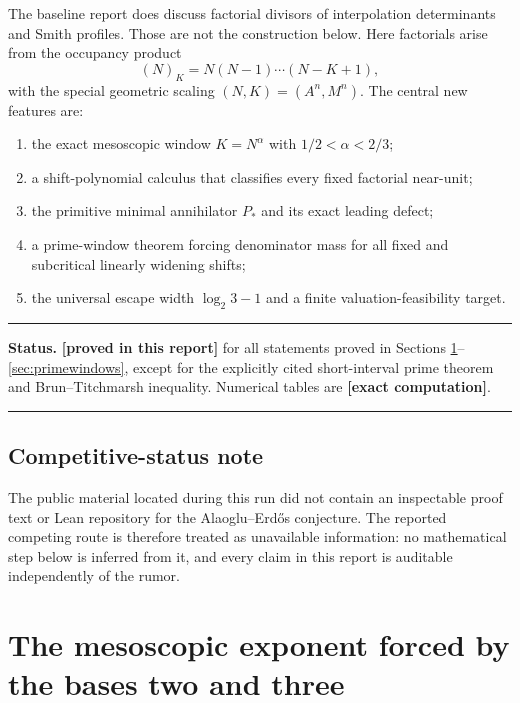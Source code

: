 \documentclass[11pt,oneside]{article}
\theoremstyle{definition}
\theoremstyle{remark}
\newcommand{\statusnew}{\textcolor{newgreen}{\textbf{[proved in this report]}}}
\newcommand{\statuscomp}{\textcolor{computeviolet}{\textbf{[exact computation]}}}
\newenvironment{statusbox}[1]
{\begin{center}\begin{minipage}{0.94\textwidth}\raggedright\hrule\vspace{0.45em}
\textbf{Status.} #1\par\vspace{0.35em}}
{\vspace{0.35em}\hrule\end{minipage}\end{center}}
\begin{document}
The baseline report does discuss factorial divisors of interpolation determinants and Smith
profiles.  Those are not the construction below.  Here factorials arise from the occupancy
product
\[
 (N)_K=N(N-1)\cdots(N-K+1),
\]
with the special geometric scaling $(N,K)=(A^n,M^n)$.  The central new features are:
\begin{enumerate}
\item the exact mesoscopic window $K=N^{\alpha}$ with $1/2<\alpha<2/3$;
\item a shift-polynomial calculus that classifies every fixed factorial near-unit;
\item the primitive minimal annihilator $P_*$ and its exact leading defect;
\item a prime-window theorem forcing denominator mass for all fixed and subcritical
      linearly widening shifts;
\item the universal escape width $\log_2 3-1$ and a finite valuation-feasibility target.
\end{enumerate}

\begin{statusbox}{\statusnew{} for all statements proved in Sections
\ref{sec:mesoscopic}--\ref{sec:primewindows}, except for the explicitly cited short-interval
prime theorem and Brun--Titchmarsh inequality.  Numerical tables are \statuscomp{}.}
\end{statusbox}

\subsection{Competitive-status note}

The public material located during this run did not contain an inspectable proof text or Lean
repository for the Alaoglu--Erd\H{o}s conjecture.  The reported competing route is therefore
treated as unavailable information: no mathematical step below is inferred from it, and every
claim in this report is auditable independently of the rumor.

\section{The mesoscopic exponent forced by the bases two and three}
\label{sec:mesoscopic}
\end{document}
